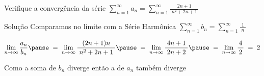 \begin{question}
  Verifique a convergência da série
  \quad
  \(
    \sum_{n=1}^{\infty} a_n = \sum_{n=1}^{\infty} \frac{2n+1}{\;n^2+2n+1\;}
  \)
\end{question}

\begin{resolution}{Solução}
  Comparamos no limite com a Série Harmônica
  \quad
  \(
    \sum_{n=1}^{\infty} b_n = \sum_{n=1}^{\infty} \frac{1}{\;n\;}
  \)

  \pause
  \vspace{0.3\baselineskip}
  \[
  \lim_{n\to\infty} \frac{a_n}{b_n}              \pause \;=\;
  \lim_{n\to\infty} \frac{(2n+1)n}{\;n^2+2n+1\;} \pause \;=\;
  \lim_{n\to\infty} \frac{4n+1}{\;2n+2\;}        \pause \;=\;
  \lim_{n\to\infty} \frac{\,4\,}{2}                     \;=\; 2
  \]

  \pause
  \vspace{0.5\baselineskip}
  Como a soma de \(b_n\) diverge então a de \(a_n\) também diverge
\end{resolution}

